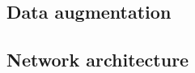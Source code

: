 \subsection{Data augmentation}
\label{subsec:data-augmentation}


\subsection{Network architecture}
\label{subsec:network-architecture}